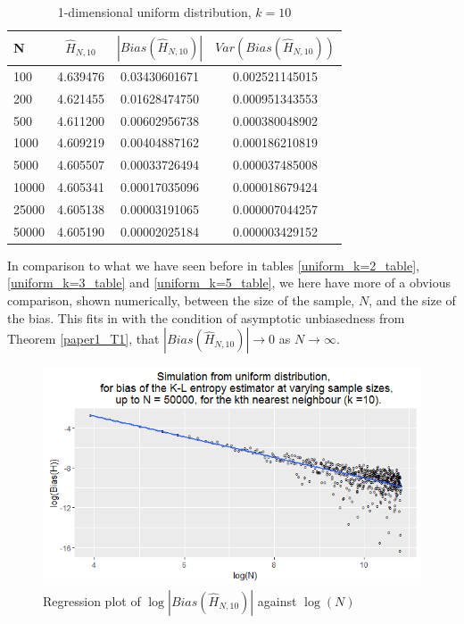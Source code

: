 \documentclass{report}
\begin{document}
\begin{table}
\caption{1-dimensional uniform distribution, $k=10$} \label{uniform_k=10_table}
\begin{center}
\begin{tabular}{| l | c c c|} 
\toprule
N & $\hat{H}_{N, 10}$ & $|Bias(\hat{H}_{N, 10})|$ & $Var(Bias(\hat{H}_{N, 10}))$ \\
\midrule[1pt]
100     & 4.639476     & 0.03430601671     & 0.002521145015  \\
200     & 4.621455     & 0.01628474750     & 0.000951343553  \\
500     & 4.611200     & 0.00602956738     & 0.000380048902  \\
1000    & 4.609219     & 0.00404887162     & 0.000186210819  \\
5000    & 4.605507     & 0.00033726494     & 0.000037485008  \\
10000   & 4.605341     & 0.00017035096     & 0.000018679424  \\
25000   & 4.605138     & 0.00003191065     & 0.000007044257  \\
50000   & 4.605190     & 0.00002025184     & 0.000003429152  \\
\hline
\end{tabular}
\end{center}
\end{table}

In comparison to what we have seen before in tables \ref{uniform_k=2_table}, \ref{uniform_k=3_table} and \ref{uniform_k=5_table}, we here have more of a obvious comparison, shown numerically, between the size of the sample, $N$, and the size of the bias. This fits in with the condition of asymptotic unbiasedness from Theorem \ref{paper1_T1}, that $|Bias(\hat{H}_{N, 10})| \to 0$ as $N \to \infty$. 

\begin{figure}
  \begin{center}
    \includegraphics[width=\textwidth]{./Graphs/Uniform_k=10_plot.png}
  \end{center}
\caption{Regression plot of $\log|Bias(\hat{H}_{N, 10})|$ against $\log(N)$}
  \label{uniform_k=10_graph}
\end{figure}
\end{document}
